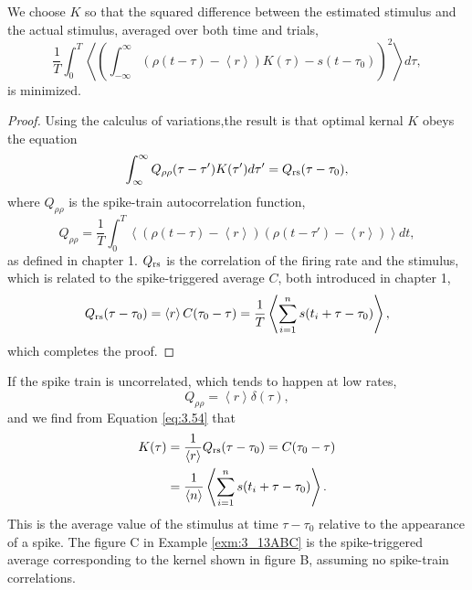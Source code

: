 \begin{prop}
  We choose $K$ so that the squared difference
between the estimated stimulus and the actual stimulus, averaged over
both time and trials,
\begin{equation}
  \label{eq:3.53}
  \frac{1}{T}\int_0^T{\left\langle \left(
        \int_{-\infty}^{\infty}(\rho(t-\tau)-\left\langle r
        \right\rangle)K(\tau)-s(t-\tau_{0}) \right)^{2} \right\rangle d\tau},
\end{equation}
is minimized.
 \begin{proof}
  Using the calculus of variations,the result is that optimal kernal $K$ obeys the equation
\begin{equation}
  \label{eq:3.54}
  \int_{\infty}^{\infty}Q_{\rho\rho}(\tau-\tau')K(\tau')d\tau'=Q_{\rm{r}s}(\tau-\tau_{0}),
\end{equation}
where $Q_{\rho\rho}$ is the spike-train autocorrelation function,
\begin{equation}
  \label{eq:3.55}
  Q_{\rho\rho}=\frac{1}{T}\int_0^T{\left\langle
      (\rho(t-\tau)-\left\langle r
      \right\rangle)(\rho(t-\tau')-\left\langle r \right\rangle)
    \right\rangle dt},
\end{equation}
as defined in chapter 1. $Q_{\rm{r}s}$ is the correlation of the firing rate and the stimulus, which is related to the spike-triggered average $C$, both introduced in
chapter 1,
\begin{equation}
  \label{equ:3.56}
Q_{\rm{r}s}(\tau-\tau_{0})=\left\langle r \right\rangle C(\tau_0-\tau)=\frac{1}{T}\left\langle \sum\limits_{i=1}^{n}{s(t_i+\tau-\tau_{0})} \right\rangle,
\end{equation}
which completes the proof.
\end{proof}
\end{prop}

\begin{exm}
  If the spike train is uncorrelated, which tends to happen at low
  rates,
  \begin{equation}
    \label{eq:3.57}
    Q_{\rho\rho}=\left\langle r \right\rangle\delta(\tau),
  \end{equation}
  and we find from Equation \ref{eq:3.54} that
  \begin{equation}
    \label{eq:3.58}
    \begin{aligned}
          K(\tau)&=\frac{1}{\left\langle r
                   \right\rangle}Q_{\rm{r}s}(\tau-\tau_{0})=C(\tau_{0}-\tau)\\
      &=\frac{1}{\left\langle n \right\rangle}\left\langle \sum\limits_{i=1}^{n}{s(t_i+\tau-\tau_{0})} \right\rangle.
    \end{aligned}
  \end{equation}
  This is the average value of the stimulus at time $\tau-\tau_{0}$
  relative to the appearance of a spike. The figure C in Example \ref{exm:3_13ABC} is the
spike-triggered average corresponding to the kernel shown in figure B, assuming no spike-train correlations.
\end{exm}

